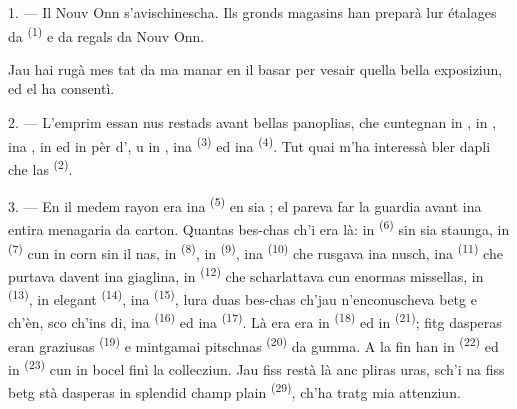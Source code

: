 \VUsaut{4.0mm}
\VUsaut{2.0mm}
\VUsaut{3.4mm}

1. --- Il Nouv Onn s'avischinescha. Ils gronds magasins han preparà lur étalages da
 \textsuperscript{(1)} e da regals da Nouv Onn.

Jau hai rugà mes tat da ma manar en il basar per vesair quella bella exposiziun, ed
el ha consentì.

2. --- L'emprim essan nus restads avant bellas panoplias, che cuntegnan in
, in , ina , in  ed in pèr
d', u in , ina  \textsuperscript{(3)} ed ina
 \textsuperscript{(4)}. Tut quai m'ha interessà bler dapli che las
 \textsuperscript{(2)}.

\VUsaut{3.0mm}
\VUsaut{2.6mm}

3. --- En il medem rayon era ina  \textsuperscript{(5)} en sia
; el pareva far la guardia avant ina entira menagaria da
carton. Quantas bes-chas ch'i era là: in  \textsuperscript{(6)} sin sia
staunga, in  \textsuperscript{(7)} cun in corn sin il nas, in 
\textsuperscript{(8)}, in  \textsuperscript{(9)}, ina 
\textsuperscript{(10)} che rusgava ina nusch, ina  \textsuperscript{(11)} che
purtava davent ina giaglina, in  \textsuperscript{(12)} che scharlattava cun
enormas missellas, in  \textsuperscript{(13)}, in elegant 
\textsuperscript{(14)}, ina  \textsuperscript{(15)}, lura duas bes-chas
ch'jau n'enconuscheva betg e ch'èn, sco ch'ins di, ina 
\textsuperscript{(16)} ed ina  \textsuperscript{(17)}. Là era era in
 \textsuperscript{(18)} ed in  \textsuperscript{(21)}; fitg dasperas
eran graziusas  \textsuperscript{(19)} e mintgamai pitschnas
\textsuperscript{(20)} da gumma. A la fin han in  \textsuperscript{(22)} ed in
 \textsuperscript{(23)} cun in bocel finì la collecziun. Jau fiss restà là
anc pliras uras, sch'i na fiss betg stà dasperas in splendid champ plain
 \textsuperscript{(29)}, ch'ha tratg mia attenziun.

